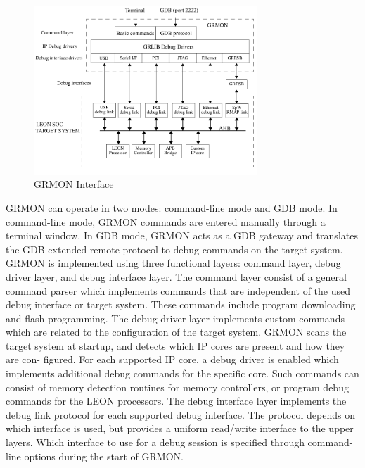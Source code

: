  \begin{figure}[ht]
    \centering
    \includegraphics[width=0.75\textwidth]{figures/others/grmon_ex.png}
    \caption{GRMON  Interface }
    \label{fig:grmon_int}
\end{figure}
GRMON can operate in two modes: command-line mode and GDB mode. In command-line mode, GRMON
commands are entered manually through a terminal window. In GDB mode, GRMON acts as a GDB gateway
and translates the GDB extended-remote protocol to debug commands on the target system.
GRMON is implemented using three functional layers: command layer, debug driver layer, and debug interface
layer. The command layer consist of a general command parser which implements commands that are independent
of the used debug interface or target system. These commands include program downloading and flash
programming.
The debug driver layer implements custom commands which are related to the configuration of the target system. 
GRMON scans the target system at startup, and detects which IP cores are present and how they are con-
figured. For each supported IP core, a debug driver is enabled which implements additional debug commands
for the specific core. Such commands can consist of memory detection routines for memory controllers, or program
debug commands for the LEON processors.
The debug interface layer implements the debug link protocol for each supported debug interface. The protocol
depends on which interface is used, but provides a uniform read/write interface to the upper layers. Which
interface to use for a debug session is specified through command-line options during the start of GRMON.



